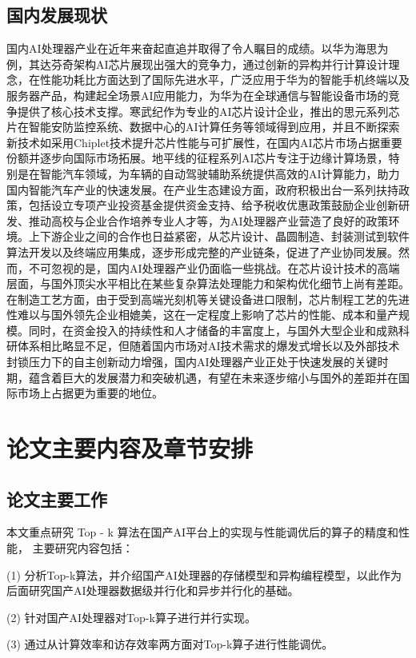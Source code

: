 \subsection{国内发展现状}
国内AI处理器产业在近年来奋起直追并取得了令人瞩目的成绩。以华为海思为例，其达芬奇架构AI芯片展现出强大的竞争力，通过创新的异构并行计算设计理念，在性能功耗比方面达到了国际先进水平，广泛应用于华为的智能手机终端以及服务器产品，构建起全场景AI应用能力，为华为在全球通信与智能设备市场的竞争提供了核心技术支撑。寒武纪作为专业的AI芯片设计企业，推出的思元系列芯片在智能安防监控系统、数据中心的AI计算任务等领域得到应用，并且不断探索新技术如采用Chiplet技术提升芯片性能与可扩展性，在国内AI芯片市场占据重要份额并逐步向国际市场拓展。地平线的征程系列AI芯片专注于边缘计算场景，特别是在智能汽车领域，为车辆的自动驾驶辅助系统提供高效的AI计算能力，助力国内智能汽车产业的快速发展。在产业生态建设方面，政府积极出台一系列扶持政策，包括设立专项产业投资基金提供资金支持、给予税收优惠政策鼓励企业创新研发、推动高校与企业合作培养专业人才等，为AI处理器产业营造了良好的政策环境。上下游企业之间的合作也日益紧密，从芯片设计、晶圆制造、封装测试到软件算法开发以及终端应用集成，逐步形成完整的产业链条，促进了产业协同发展。然而，不可忽视的是，国内AI处理器产业仍面临一些挑战。在芯片设计技术的高端层面，与国外顶尖水平相比在某些复杂算法处理能力和架构优化细节上尚有差距。在制造工艺方面，由于受到高端光刻机等关键设备进口限制，芯片制程工艺的先进性难以与国外领先企业相媲美，这在一定程度上影响了芯片的性能、成本和量产规模。同时，在资金投入的持续性和人才储备的丰富度上，与国外大型企业和成熟科研体系相比略显不足，但随着国内市场对AI技术需求的爆发式增长以及外部技术封锁压力下的自主创新动力增强，国内AI处理器产业正处于快速发展的关键时期，蕴含着巨大的发展潜力和突破机遇，有望在未来逐步缩小与国外的差距并在国际市场上占据更为重要的地位。


\section{论文主要内容及章节安排}
\subsection{论文主要工作}
本文重点研究 Top - k 算法在国产AI平台上的实现与性能调优后的算子的精度和性能，
主要研究内容包括：

(1) 分析Top-k算法，并介绍国产AI处理器的存储模型和异构编程模型，以此作为后面研究国产AI处理器数据级并行化和异步并行化的基础。

(2) 针对国产AI处理器对Top-k算子进行并行实现。

(3) 通过从计算效率和访存效率两方面对Top-k算子进行性能调优。

